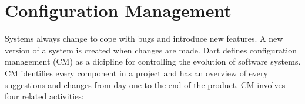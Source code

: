 

\section{Configuration Management}
Systems always change to cope with bugs and introduce new features. A new version of a system is created when changes are made. Dart\cite{dart1991concepts} defines configuration management (CM) as a dicipline for controlling the evolution of software systems. CM identifies every component in a project and has an overview of every suggestions and changes from day one to the end of the product. CM involves four related activities\cite{Sommerville:2011:SE}:
